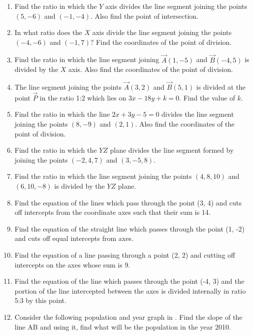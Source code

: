 \begin{enumerate}[label=\thesubsection.\arabic*, ref=\thesubsection.\theenumi]
	\\
\solution 
\label{chapters/11/10/2/12}

\item Find the ratio in which the $Y$ axis divides the line segment joining the points $(5,-6)$ and $(-1,-4)$. Also find the point of intersection.
\item In what ratio does the $X$ axis divide the line segment joining the points $(-4,-6)$ and $(-1,7)$? Find the coordinates of the point of division.
\item Find the ratio in which the line segment joining $\vec{A}(1,-5)$  and  $\vec{B}(-4,5)$ is divided by the $X$ axis. Also find the coordinates of the point of division.
%
\item The line segment joining the points $\vec{A}(3,2)$ and $\vec{B}(5,1)$ is divided at the point $\vec{P}$ in the ratio 1:2 which lies on $3x-18y+k=0$. Find the value of $k$.  
\item Find the ratio in which the line $2x+3y-5=0$ divides the line segment joining the points $(8,-9)$ and $(2,1)$. Also find the coordinates of the point of division.
\item Find the ratio in which the $YZ$ plane divides the line segment formed by joining the points $(-2,4,7)$ and $(3,-5,8)$.
\item Find the ratio in which the line segment joining the points $(4,8,10)$ and $(6,10,-8)$ is divided by the $YZ$ plane.
\item Find the equation of the lines which pass through the point (3, 4) and cuts off intercepts from the coordinate axes such that their sum is 14.
\item Find the equation of the straight line which passes through the point (1,  -2) and cuts off equal intercepts from axes.
\item 
Find the equation of a line passing through a point (2, 2) and cutting off intercepts on the axes whose sum is 9.
\label{chapters/11/10/2/13}
	\\
	\solution 

\item Find the equation of the line which passes through the point (-4, 3) and the portion of the line intercepted between the axes is divided internally in ratio 5:3 by this point.
\item Consider the following population and year graph
in .
	Find the slope of the line AB and using it,  find what will be the population in the year 2010.
\\

\end{enumerate}
